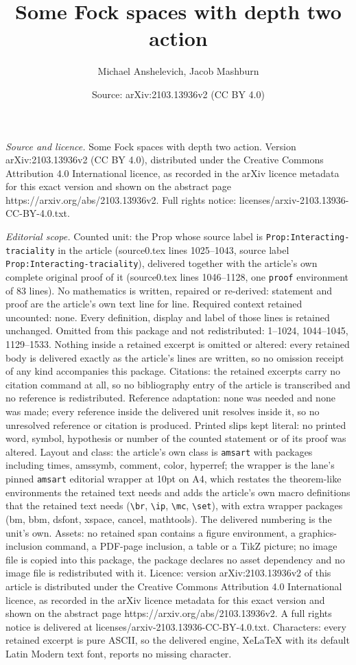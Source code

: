 \documentclass[10pt,a4paper]{amsart}
\title[Some Fock spaces with depth two action]{Some Fock spaces with depth two action}
\author{Michael Anshelevich, Jacob Mashburn}
\date{Source: arXiv:2103.13936v2 (CC BY 4.0)}
\begin{document}
\maketitle

\noindent\emph{Source and licence.} Some Fock spaces with depth two action. Version arXiv:2103.13936v2 (CC BY 4.0), distributed under the Creative Commons Attribution 4.0 International licence, as recorded in the arXiv licence metadata for this exact version and shown on the abstract page https://arxiv.org/abs/2103.13936v2. Full rights notice: licenses/arxiv-2103.13936-CC-BY-4.0.txt.\par\smallskip

\noindent\textit{Editorial scope.} Counted unit: the Prop whose source label is \texttt{Prop:Interacting-traciality} in the article (source0.tex lines 1025--1043, source label \texttt{Prop:Interacting-traciality}), delivered together with the article's own complete original proof of it (source0.tex lines 1046--1128, one \texttt{proof} environment of 83 lines). No mathematics is written, repaired or re-derived: statement and proof are the article's own text line for line. Required context retained uncounted: none. Every definition, display and label of those lines is retained unchanged. Omitted from this package and not redistributed: 1--1024, 1044--1045, 1129--1533. Nothing inside a retained excerpt is omitted or altered: every retained body is delivered exactly as the article's lines are written, so no omission receipt of any kind accompanies this package. Citations: the retained excerpts carry no citation command at all, so no bibliography entry of the article is transcribed and no reference is redistributed. Reference adaptation: none was needed and none was made; every reference inside the delivered unit resolves inside it, so no unresolved reference or citation is produced. Printed slips kept literal: no printed word, symbol, hypothesis or number of the counted statement or of its proof was altered. Layout and class: the article's own class is \texttt{amsart} with packages including times, amssymb, comment, color, hyperref; the wrapper is the lane's pinned \texttt{amsart} editorial wrapper at 10pt on A4, which restates the theorem-like environments the retained text needs and adds the article's own macro definitions that the retained text needs (\texttt{\textbackslash br}, \texttt{\textbackslash ip}, \texttt{\textbackslash mc}, \texttt{\textbackslash set}), with extra wrapper packages (bm, bbm, dsfont, xspace, cancel, mathtools). The delivered numbering is the unit's own. Assets: no retained span contains a figure environment, a graphics-inclusion command, a PDF-page inclusion, a table or a TikZ picture; no image file is copied into this package, the package declares no asset dependency and no image file is redistributed with it. Licence: version arXiv:2103.13936v2 of this article is distributed under the Creative Commons Attribution 4.0 International licence, as recorded in the arXiv licence metadata for this exact version and shown on the abstract page https://arxiv.org/abs/2103.13936v2. A full rights notice is delivered at licenses/arxiv-2103.13936-CC-BY-4.0.txt. Characters: every retained excerpt is pure ASCII, so the delivered engine, XeLaTeX with its default Latin Modern text font, reports no missing character.
\end{document}
